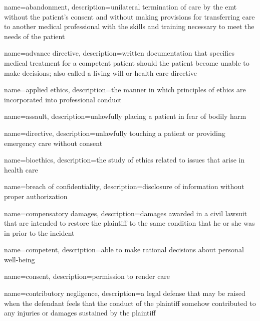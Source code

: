 \documentclass[../../EMT-169.tex]{subfiles}
\begin{document}
\setcounter{chapter}{2}
\label{ch:chapter3}
\clearpage
	
	
	{
		name=abandonment,
		description={unilateral termination of care by the \acrshort{emt} without the patient's consent and without making provisions for transferring care to another medical professional with the skills and training necessary to meet the needs of the patient}
	}

	{
		name=advance directive,
		description={written documentation that specifies medical treatment for a competent patient should the patient become unable to make decisions; also called a living will or health care directive}
	}

	{
		name=applied ethics,
		description={the manner in which principles of ethics are incorporated into professional conduct}
	}

	{
		name=assault,
		description={unlawfully placing a patient in fear of bodily harm}
	}

	{
		name=directive,
		description={unlawfully touching a patient or providing emergency care without consent}
	}

	{
		name=bioethics,
		description={the study of ethics related to issues that arise in health care}
	}

	{
		name=breach of confidentiality,
		description={disclosure of information without proper authorization}
	}


	{
		name=compensatory damages,
		description={damages awarded in a civil lawsuit that are intended to restore the plaintiff to the same condition that he or she was in prior to the incident}
	}

	{
		name=competent,
		description={able to make rational decisions about personal well-being}
	}

	{
		name=consent,
		description={permission to render care}
	}

	{
		name=contributory negligence,
		description={a legal defense that may be raised when the defendant feels that the conduct of the plaintiff somehow contributed to any injuries or damages sustained by the plaintiff}
	}
\end{document}
